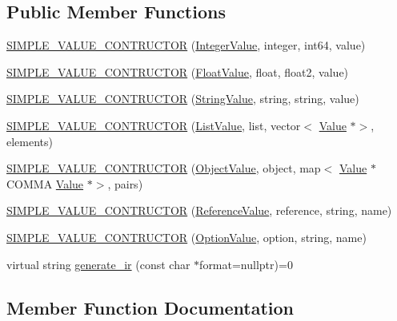 \subsection*{Public Member Functions}
\begin{DoxyCompactItemize}
\item 
\hyperlink{classeviir_1_1Value_a6870e847f6b19c002b34ad62f2b09da0}{S\+I\+M\+P\+L\+E\+\_\+\+V\+A\+L\+U\+E\+\_\+\+C\+O\+N\+T\+R\+U\+C\+T\+OR} (\hyperlink{classeviir_1_1IntegerValue}{Integer\+Value}, integer, int64, value)
\item 
\hyperlink{classeviir_1_1Value_a3617c67c6a086ea32d6c555a57120003}{S\+I\+M\+P\+L\+E\+\_\+\+V\+A\+L\+U\+E\+\_\+\+C\+O\+N\+T\+R\+U\+C\+T\+OR} (\hyperlink{classeviir_1_1FloatValue}{Float\+Value}, float, float2, value)
\item 
\hyperlink{classeviir_1_1Value_ae1a5aed10e2b2c0a7b76a06a74cf00cf}{S\+I\+M\+P\+L\+E\+\_\+\+V\+A\+L\+U\+E\+\_\+\+C\+O\+N\+T\+R\+U\+C\+T\+OR} (\hyperlink{classeviir_1_1StringValue}{String\+Value}, string, string, value)
\item 
\hyperlink{classeviir_1_1Value_aaa32965c6f0535817b09cacd75b30c67}{S\+I\+M\+P\+L\+E\+\_\+\+V\+A\+L\+U\+E\+\_\+\+C\+O\+N\+T\+R\+U\+C\+T\+OR} (\hyperlink{classeviir_1_1ListValue}{List\+Value}, list, vector$<$ \hyperlink{classeviir_1_1Value}{Value} $\ast$$>$, elements)
\item 
\hyperlink{classeviir_1_1Value_a89848fcdb3d649a6a7f0813c6e38c904}{S\+I\+M\+P\+L\+E\+\_\+\+V\+A\+L\+U\+E\+\_\+\+C\+O\+N\+T\+R\+U\+C\+T\+OR} (\hyperlink{classeviir_1_1ObjectValue}{Object\+Value}, object, map$<$ \hyperlink{classeviir_1_1Value}{Value} $\ast$C\+O\+M\+MA \hyperlink{classeviir_1_1Value}{Value} $\ast$$>$, pairs)
\item 
\hyperlink{classeviir_1_1Value_a2e213dc1ba72a82016c3d8d6f4db4afb}{S\+I\+M\+P\+L\+E\+\_\+\+V\+A\+L\+U\+E\+\_\+\+C\+O\+N\+T\+R\+U\+C\+T\+OR} (\hyperlink{classeviir_1_1ReferenceValue}{Reference\+Value}, reference, string, name)
\item 
\hyperlink{classeviir_1_1Value_ad872325f078f87de60adbeae6eab8f98}{S\+I\+M\+P\+L\+E\+\_\+\+V\+A\+L\+U\+E\+\_\+\+C\+O\+N\+T\+R\+U\+C\+T\+OR} (\hyperlink{classeviir_1_1OptionValue}{Option\+Value}, option, string, name)
\item 
virtual string \hyperlink{classeviir_1_1Value_a0613bf660425df31e230681555f64dea}{generate\+\_\+ir} (const char $\ast$format=nullptr)=0
\end{DoxyCompactItemize}


\subsection{Member Function Documentation}
\mbox{\label{classeviir_1_1Value_a0613bf660425df31e230681555f64dea}} 
